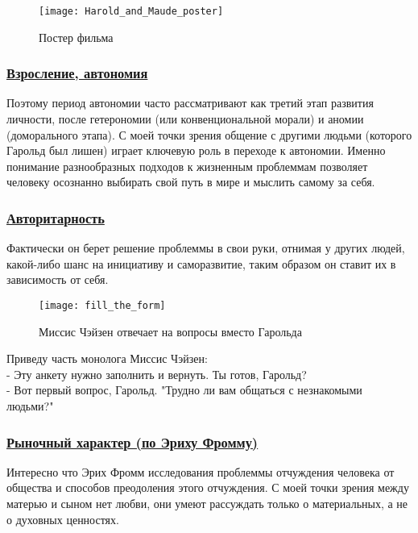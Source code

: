 \documentclass[a4paper,12pt]{report} %
\begin{document}
\begin{figure}[!h]
	\centering
	\texttt{[image: Harold\_and\_Maude\_poster]}
	\caption{Постер фильма}
\end{figure}

\newpage


\subsubsection{\underline{Взросление, автономия}}


Поэтому период автономии часто рассматривают как третий этап развития личности, после гетерономии (или конвенциональной морали) и аномии (доморального этапа). С моей точки зрения общение с другими людьми (которого Гарольд был лишен) играет ключевую роль в переходе к автономии. Именно понимание разнообразных подходов к жизненным проблеммам позволяет человеку осознанно выбирать свой путь в мире и мыслить самому за себя.


\subsubsection{\underline{Авторитарность}}

Фактически он берет решение проблеммы в свои руки, отнимая у других людей, какой-либо шанс на инициативу и саморазвитие, таким образом он ставит их в зависимость от себя.


\begin{figure}[!h]
	\centering
	\texttt{[image: fill\_the\_form]}
	\caption{Миссис Чэйзен отвечает на вопросы вместо Гарольда}
\end{figure}

\newpage

Приведу часть монолога Миссис Чэйзен: \\

{\small
 - Эту анкету нужно заполнить и вернуть. Ты готов, Гарольд? \\
 - Вот первый вопрос, Гарольд. "Трудно ли вам общаться с незнакомыми людьми?" \\
}

\subsubsection{\underline{Рыночный характер (по Эриху Фромму)}}

Интересно что Эрих Фромм исследования проблеммы отчуждения человека от общества и способов преодоления этого отчуждения. С моей точки зрения между матерью и сыном нет любви, они умеют рассуждать только о материальных, а не о духовных ценностях. 
\end{document}
